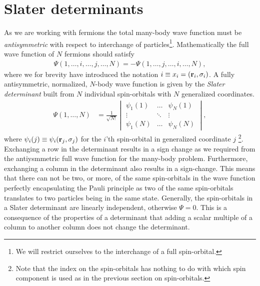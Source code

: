     \section{Slater determinants}
        As we are working with fermions the total many-body wave function must
        be \emph{antisymmetric} with respect to interchange of
        particles\footnote{We will restrict ourselves to the interchange of a
        full spin-orbital.}. Mathematically the full wave function of $N$
        fermions should satisfy
        \begin{align}
            \Psi(1, \dots, i, \dots, j, \dots, N)
            =
            -\Psi(1, \dots, j, \dots, i, \dots, N),
        \end{align}
        where we for brevity have introduced the notation $i \equiv x_i =
        (\mathbf{r}_i, \sigma_i)$. A fully antisymmetric, normalized, $N$-body wave
        function is given by the \emph{Slater determinant} built from $N$
        individual spin-orbitals with $N$ generalized coordinates.
        \begin{align}
            \Psi(1, \dots, N)
            &= \frac{1}{\sqrt{N!}}
            \begin{vmatrix}
                \psi_1(1) & \dots & \psi_N(1) \\
                \vdots & \ddots & \vdots \\
                \psi_1(N) & \dots & \psi_N(N)
            \end{vmatrix},
            \label{eq:coord_slater}
        \end{align}
        where $\psi_i(j) \equiv \psi_i(\mathbf{r}_j, \sigma_j)$ for the $i$'th
        spin-orbital in generalized coordinate $j$ \footnote{Note that the index
        on the spin-orbitals has nothing to do with which spin component is used
        as in the previous section on spin-orbitals.}. Exchanging a row in the
        determinant results in a sign change as we required from the
        antiysmmetric full wave function for the many-body problem. Furthermore,
        exchanging a column in the determinant also results in a sign-change.
        This means that there can not be two, or more, of the same spin-orbitals
        in the wave function perfectly encapsulating the Pauli principle as two
        of the same spin-orbitals translates to two particles being in the same
        state. Generally, the spin-orbitals in a Slater determinant are linearly
        independent, otherwise $\Psi = 0$. This is a consequence of the
        properties of a determinant that adding a scalar multiple of a column to
        another column does not change the determinant.

